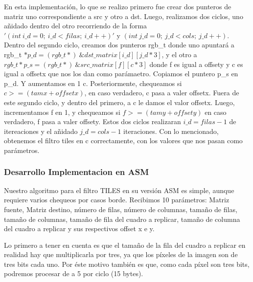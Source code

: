 En esta implementación, lo que se realizo primero fue crear dos punteros de matriz uno correspondiente a src y otro a dst.\newline
Luego, realizamos dos ciclos, uno añidado dentro del otro recorriendo de la forma $'(int\ i\_d = 0;\ i\_d < filas;\ i\_d++)'$ y 
$(int\ j\_d = 0;\ j\_d < cols;\ j\_d++)$.\newline
Dentro del segundo ciclo, creamos dos punteros rgb\_t donde uno apuntará a \newline rgb\_t $*p\_d = (rgb\_t*)\  \&dst\_matrix[i\_d][j\_d*3]$, y el otro
a $rgb\_t *p\_s = (rgb\_t*)\ \&src\_matrix[f][c*3]$ donde f es igual a offsety y c es igual a offsetx que nos los dan como parámaetro.\newline
Copiamos el puntero p\_s en p\_d. Y aumentamos en 1 c.\newline
Posteriormente, chequeamos si $c >= (tamx + offsetx)$, en caso verdadero, c pasa a valer offsetx.\newline
Fuera de este segundo ciclo, y dentro del primero, a c le damos el valor offsetx.\newline
Luego, incrementamos f en 1, y chequeamos si $f >= (tamy + offsety)$ en caso verdadero, f pasa a valer offsety.\newline
Estos dos ciclos realizaran $i\_d = filas -1$ de itereaciones y el añidado $j\_d = cols - 1$ iteraciones.\newline
Con lo mencionado, obtenemos el filtro tiles en c correctamente, con los valores que nos pasan como parámetros.\newline

\vspace*{0.3cm} \noindent
\subsubsection{Desarrollo Implementacion en ASM}


Nuestro algoritmo para el filtro TILES en su versión ASM es simple, aunque requiere varios chequeos por casos borde. \newline
Recibimos 10 parámetros: Matriz fuente, Matriz destino, número de filas, número de columnas, tamaño de filas, tamaño 
de columnas, tamaño de fila del cuadro a replicar, tamaño de columna del cuadro a replicar y sus respectivos offset x e y.\newline

Lo primero a tener en cuenta es que el tamaño de la fila del cuadro a replicar en realidad hay que multiplicarla por tres,
ya que los píxeles de la imagen son de tres bits cada uno.\newline
Por éste motivo también es que, como cada píxel son tres bits, podremos procesar de a 5 por ciclo (15 bytes). \newline

